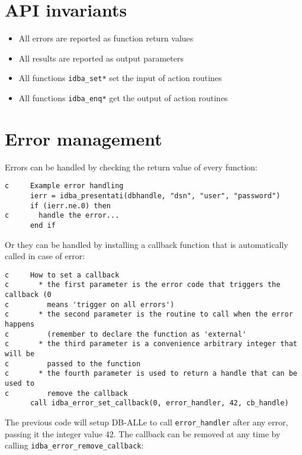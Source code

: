 \documentclass[final,12pt,a4paper,twoside]{book}
\begin{document}
\section {API invariants}

\label{fun-error}

\begin{itemize}
\item All errors are reported as function return values
\item All results are reported as output parameters
\item All functions {\tt idba\_set*} set the input of action routines
\item All functions {\tt idba\_enq*} get the output of action routines
\end{itemize}

\section {Error management}

Errors can be handled by checking the return value of every function:

\begin{verbatim}
c     Example error handling
      ierr = idba_presentati(dbhandle, "dsn", "user", "password")
      if (ierr.ne.0) then
c       handle the error...
      end if
\end{verbatim}

Or they can be handled by installing a callback function that is automatically
called in case of error:

\begin{verbatim}
c     How to set a callback
c       * the first parameter is the error code that triggers the callback (0
c         means 'trigger on all errors')
c       * the second parameter is the routine to call when the error happens        
c         (remember to declare the function as 'external'
c       * the third parameter is a convenience arbitrary integer that will be
c         passed to the function
c       * the fourth parameter is used to return a handle that can be used to
c         remove the callback
      call idba_error_set_callback(0, error_handler, 42, cb_handle)
\end{verbatim}

The previous code will setup DB-ALLe to call {\tt error\_handler} after any error,
passing it the integer value 42.  The callback can be removed at any time by
calling {\tt idba\_error\_remove\_callback}:
 
\end{document}
